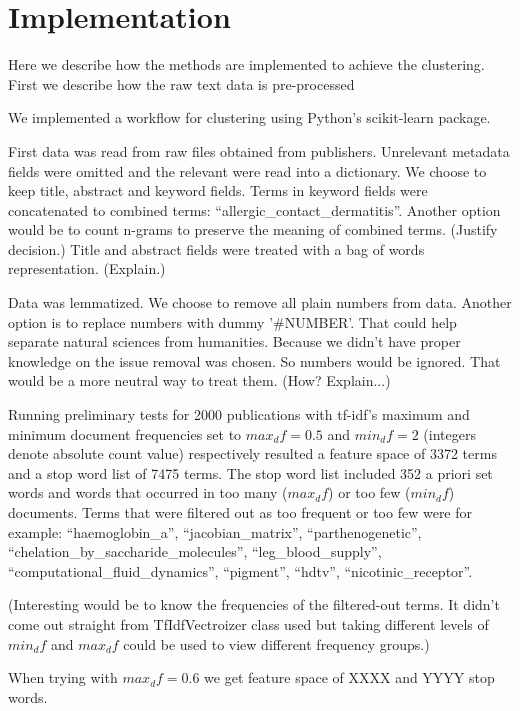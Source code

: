 \chapter{Implementation}
\label{chapter:implementation}
Here we describe how the methods are implemented to achieve the 
clustering. First we describe how the raw text data is 
pre-processed 

We implemented a workflow for clustering using Python's 
scikit-learn package. 

First data was read from raw files obtained from publishers. 
Unrelevant metadata fields were omitted and the relevant were read 
into a dictionary. We choose to keep title, abstract and keyword
fields. Terms in keyword fields were concatenated to combined 
terms: ``allergic\_contact\_dermatitis''. Another option would be to
count n-grams to preserve the meaning of combined terms. (Justify 
decision.) Title and abstract fields were treated with a bag of 
words representation. (Explain.)



Data was lemmatized. We choose to remove all plain numbers from
data. Another option is to replace numbers with dummy '\#NUMBER'.
That could help separate natural sciences from humanities. Because 
we didn't have proper knowledge on the issue removal was chosen. So 
numbers would be ignored. That would be a more neutral way to treat 
them. (How? Explain...)

Running preliminary tests for 2000 publications with tf-idf's maximum and 
minimum document frequencies set to $max_df=0.5$ 
and $min_df=2$ (integers denote absolute count value) respectively
resulted a feature space of 3372 terms and a stop word list of 7475 
terms. The stop word list included 352 a priori set words and words
that occurred in too many ($max_df$) or too few ($min_df$) 
documents. Terms that were filtered out as too frequent or too few
were for example: ``haemoglobin\_a'', ``jacobian\_matrix'', 
``parthenogenetic'', ``chelation\_by\_saccharide\_molecules'', 
``leg\_blood\_supply'', ``computational\_fluid\_dynamics'', 
``pigment'', ``hdtv'', ``nicotinic\_receptor''.

(Interesting would be to know the frequencies of the filtered-out 
terms. It didn't come out straight from TfIdfVectroizer class used 
but taking different levels of $min_df$ and $max_df$ could be used 
to view different frequency groups.)

When trying with $max_df=0.6$ we get feature space of XXXX and 
YYYY stop words.

